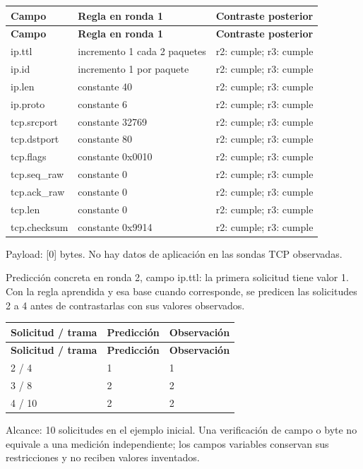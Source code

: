 \begingroup
\fontsize{9}{11}\selectfont
\addtocounter{table}{-1}
\begin{longtable}{p{3.1cm}p{5.8cm}p{5.1cm}}
\toprule
\textbf{Campo} & \textbf{Regla en ronda 1} & \textbf{Contraste posterior} \\ \midrule
\endfirsthead
\toprule
\textbf{Campo} & \textbf{Regla en ronda 1} & \textbf{Contraste posterior} \\ \midrule
\endhead
ip.ttl & incremento 1 cada 2 paquetes & r2: cumple; r3: cumple \\
ip.id & incremento 1 por paquete & r2: cumple; r3: cumple \\
ip.len & constante 40 & r2: cumple; r3: cumple \\
ip.proto & constante 6 & r2: cumple; r3: cumple \\
tcp.srcport & constante 32769 & r2: cumple; r3: cumple \\
tcp.dstport & constante 80 & r2: cumple; r3: cumple \\
tcp.flags & constante 0x0010 & r2: cumple; r3: cumple \\
tcp.seq\_\allowbreak{}raw & constante 0 & r2: cumple; r3: cumple \\
tcp.ack\_\allowbreak{}raw & constante 0 & r2: cumple; r3: cumple \\
tcp.len & constante 0 & r2: cumple; r3: cumple \\
tcp.checksum & constante 0x9914 & r2: cumple; r3: cumple \\
\bottomrule
\end{longtable}
\endgroup
Payload: [0] bytes. No hay datos de aplicación en las sondas TCP observadas.

Predicción concreta en ronda 2, campo ip.ttl: la primera solicitud tiene valor 1. Con la regla aprendida y esa base cuando corresponde, se predicen las solicitudes 2 a 4 antes de contrastarlas con sus valores observados.

\begingroup
\fontsize{9}{11}\selectfont
\addtocounter{table}{-1}
\begin{longtable}{p{3.2cm}p{5.1cm}p{5.1cm}}
\toprule
\textbf{Solicitud / trama} & \textbf{Predicción} & \textbf{Observación} \\ \midrule
\endfirsthead
\toprule
\textbf{Solicitud / trama} & \textbf{Predicción} & \textbf{Observación} \\ \midrule
\endhead
2 / 4 & 1 & 1 \\
3 / 8 & 2 & 2 \\
4 / 10 & 2 & 2 \\
\bottomrule
\end{longtable}
\endgroup
Alcance: 10 solicitudes en el ejemplo inicial. Una verificación de campo o byte no equivale a una medición independiente; los campos variables conservan sus restricciones y no reciben valores inventados.

